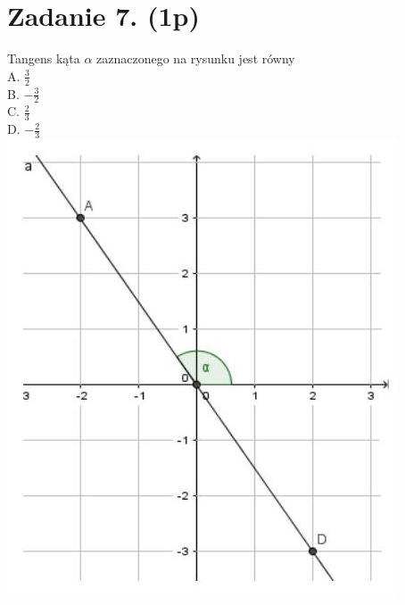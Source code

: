 \documentclass[10pt]{article}
\begin{document}
\section*{Zadanie 7. (1p)}
Tangens kąta \(\alpha\) zaznaczonego na rysunku jest równy\\
A. \(\frac{3}{2}\)\\
B. \(-\frac{3}{2}\)\\
C. \(\frac{2}{3}\)\\
D. \(-\frac{2}{3}\)\\
\includegraphics[max width=\textwidth, center]{2024_11_21_b63ac6eb3d78a57ac924g-02}
\end{document}
